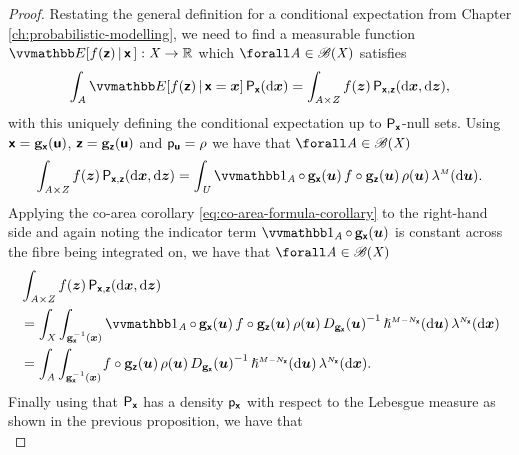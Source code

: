 \begin{proof}
Restating the general definition for a conditional expectation from Chapter \ref{ch:probabilistic-modelling}, we need to find a measurable function $\expc{f(\rvct{z}) \gvn \rvct{x}\,} : \set{X} \to \reals$ which $\forall\set{A} \in \borel(\set{X})$ satisfies
\begin{equation*}
  \int_{\set{A}}
    \expc{f(\rvct{z}) \gvn \rvct{x} = \vct{x}} 
  \,\prob{\rvct{x}}(\dr\vct{x}) =
  \int_{\set{A} \times \set{Z}}
    f(\vct{z}) 
  \,\prob{\rvct{x},\rvct{z}}(\dr\vct{x},\dr\vct{z}),
\end{equation*}
with this uniquely defining the conditional expectation up to $\mathsf{P}_{\boldsymbol{\mathsf{x}}}$-null sets. Using $\boldsymbol{\mathsf{x}} = {\mathbf{g}}_{\boldsymbol{\mathsf{x}}}(\boldsymbol{\mathsf{u}})$, $\boldsymbol{\mathsf{z}} = {\mathbf{g}}_{\boldsymbol{\mathsf{z}}}(\boldsymbol{\mathsf{u}})$ and $\mathsf{p}_{\boldsymbol{\mathsf{u}}} = \rho$ we have that $\forall\set{A} \in \borel(\set{X})$
\begin{equation*}
  \int_{\set{A} \times \set{Z}}
    f(\vct{z}) 
  \,\prob{\rvct{x},\rvct{z}}(\dr\vct{x},\dr\vct{z}) =
  \int_{\set{U}}
  \ind{\set{A}}\circ\,\genfunc_{\rvct{x}}(\vct{u})\,
  f\circ\genfunc_{\rvct{z}}(\vct{u})\,
  \rho(\vct{u})
  \,\lebm{M}(\dr\vct{u}).
\end{equation*}
Applying the co-area corollary \eqref{eq:co-area-formula-corollary} to the right-hand side and again noting the indicator term $\ind{\set{A}}\circ\,\genfunc_{\rvct{x}}(\vct{u})$ is constant across the fibre being integrated on, we have that $\forall \set{A} \in\borel(\set{X})$
\begin{align*}
  &\int_{\set{A} \times \set{Z}}
    f(\vct{z}) 
  \,\prob{\rvct{x},\rvct{z}}(\dr\vct{x},\dr\vct{z})\\
  &=
  \int_{\set{X}} \int_{\preimage{\genfunc_{\rvct{x}}}{\vct{x}}}
   \ind{\set{A}}\circ\,\genfunc_{\rvct{x}}(\vct{u})\,
   f\circ\genfunc_{\rvct{z}}(\vct{u})\,
   \rho(\vct{u})\,
   \jacobproddet{\genfunc_{\rvct{x}}}{\vct{u}}^{-1}
  \,\haum{M-{N_{\rvct{x}}}}(\dr\vct{u})
  \,\lebm{N_{\rvct{x}}}(\dr\vct{x})
  \\
  &=
  \int_{\set{A}}
  \int_{\preimage{\genfunc_{\rvct{x}}}{\vct{x}}}\kern-1pt
   f\circ\genfunc_{\rvct{z}}(\vct{u})\,
   \rho(\vct{u})\,
   \jacobproddet{\genfunc_{\rvct{x}}}{\vct{u}}^{-1}
  \,\haum{M-{N_{\rvct{x}}}}(\dr\vct{u})
  \,\lebm{N_{\rvct{x}}}(\dr\vct{x}).
\end{align*}
Finally using that $\mathsf{P}_{\boldsymbol{\mathsf{x}}}$ has a density $\mathsf{p}_{\boldsymbol{\mathsf{x}}}$ with respect to the Lebesgue measure as shown in the previous proposition, we have that
\begin{equation*}

\end{equation*}
\end{proof}
